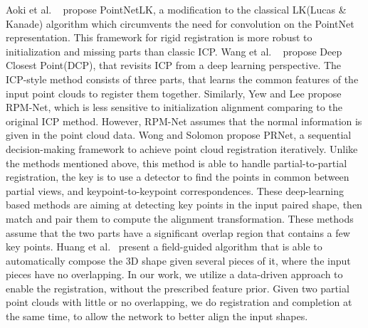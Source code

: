 Aoki et al. ~ propose PointNetLK, a modification to the classical LK(Lucas \& Kanade) algorithm which circumvents the need for convolution on the PointNet representation. This framework for rigid registration is more robust to initialization and missing parts than classic ICP.
Wang et al. ~ propose Deep Closest Point(DCP), that revisits ICP from a deep learning perspective. The ICP-style method consists of three parts, that learns the common features of the input point clouds to register them together.
Similarly, Yew and Lee  propose RPM-Net, which is less sensitive to initialization alignment comparing to the original ICP method. However, RPM-Net assumes that the normal information is given in the point cloud data.
Wong and Solomon  propose PRNet, a sequential decision-making framework to achieve point cloud registration iteratively. Unlike the methods mentioned above, this method is able to handle partial-to-partial registration, the key is to use a detector to find the points in common between partial views, and keypoint-to-keypoint correspondences. These deep-learning based methods are aiming at detecting key points in the input paired shape, then match and pair them to compute the alignment transformation. 
These methods assume that the two parts have a significant overlap region that contains a few key points. 
Huang et al.~ present a field-guided algorithm that is able to automatically compose the 3D shape given several pieces of it, where the input pieces have no overlapping. In our work, we utilize a data-driven approach to enable the registration, without the prescribed feature prior. Given two partial point clouds with little or no overlapping, we do registration and completion at the same time, to allow the network to better align the input shapes.


